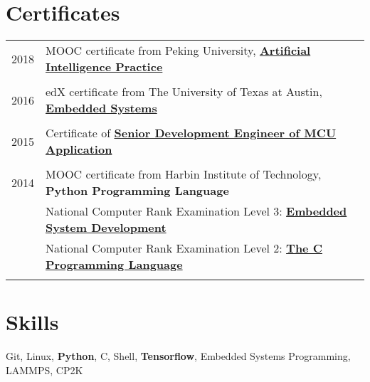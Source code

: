 \documentclass[a4paper,10pt]{article} %
\begin{document}
\section{Certificates}
\begin{tabular}{r|l}	
2018                        & MOOC certificate from Peking University, \href{https://nbviewer.org/github/HuangJiaLian/DataBase0/blob/edd29a7b30885820fabc6720dac9bd56c0cb9851/uPic/2021_11_26_10_Peking_AI.png}{\textbf{Artificial Intelligence Practice}}\\
\multicolumn{2}{c}{} \\	%

2016                        & edX certificate from The University of Texas at Austin, \href{https://nbviewer.org/github/HuangJiaLian/DataBase0/blob/37d6fc3eadd7a5276f030f00b0a618de66df0e78/uPic/2021_11_26_09_UTAustinX_UT.6.03x_Certificate_edX.pdf}{\textbf{Embedded Systems} }\\   	
\multicolumn{2}{c}{} \\	%

2015                     & Certificate of \href{https://nbviewer.org/github/HuangJiaLian/DataBase0/blob/f0bbfb6e2f2189b6ae0c43100579b9605faed6a6/uPic/2021_11_26_12_8.png}{\textbf{Senior Development Engineer of MCU Application}}\\
\multicolumn{2}{c}{} \\	%

2014                     & MOOC certificate from Harbin Institute of Technology, \textbf{Python Programming Language} \\
& National Computer Rank Examination Level 3: \href{https://nbviewer.org/github/HuangJiaLian/DataBase0/blob/bffb5248aa974d5a5a0b1b5c9130951158f4f460/uPic/2021_11_26_11_6.png}{\textbf{Embedded System Development}}\\
& National Computer Rank Examination Level 2: \href{https://nbviewer.org/github/HuangJiaLian/DataBase0/blob/c19c03dbdc866420984cbe97a48893b40c02fa78/uPic/2021_11_26_11_5.png}{\textbf{The C Programming Language}}\\
\multicolumn{2}{c}{} \\	%
\end{tabular}

\section{Skills}
\begin{small}
Git, Linux, \textbf{Python}, C, Shell, \textbf{Tensorflow}, Embedded Systems Programming, LAMMPS, CP2K
\end{small}
\\
\end{document}

